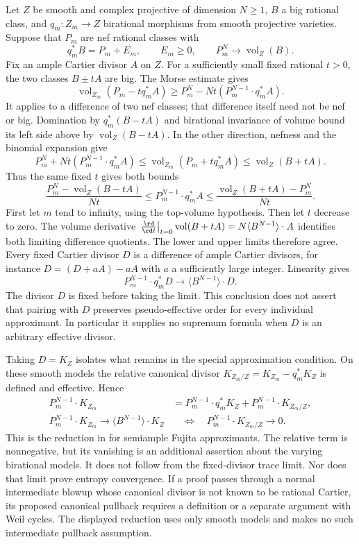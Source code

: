 Let $Z$ be smooth and complex projective of dimension $N\geq1$,
$B$ a big rational class, and $q_m:Z_m\to Z$ birational morphisms
from smooth projective varieties. Suppose that $P_m$ are nef rational
classes with
\[
 q_m^*B=P_m+E_m,\qquad E_m\geq0,
 \qquad P_m^N\longrightarrow\operatorname{vol}_Z(B).
\]
Fix an ample Cartier divisor $A$ on $Z$. For a sufficiently small
fixed rational $t>0$, the two classes $B\pm tA$ are big.
The Morse estimate gives
\[
 \operatorname{vol}_{Z_m}(P_m-tq_m^*A)
       \geq P_m^N-Nt(P_m^{N-1}\cdot q_m^*A).
\]
It applies to a difference of two nef classes; that difference itself
need not be nef or big. Domination by $q_m^*(B-tA)$ and birational
invariance of volume bound its left side above by
$\operatorname{vol}_Z(B-tA)$. In the other direction, nefness and
the binomial expansion give
\[
 P_m^N+Nt(P_m^{N-1}\cdot q_m^*A)
 \leq\operatorname{vol}_{Z_m}(P_m+tq_m^*A)
 \leq\operatorname{vol}_Z(B+tA).
\]
Thus the same fixed $t$ gives both bounds
\[
 \frac{P_m^N-\operatorname{vol}_Z(B-tA)}{Nt}
 \leq P_m^{N-1}\cdot q_m^*A
 \leq\frac{\operatorname{vol}_Z(B+tA)-P_m^N}{Nt}.
\tag{46.10k}\label{eq:ch46-fixed-trace-volume-bounds}
\]
First let $m$ tend to infinity, using the top-volume hypothesis.
Then let $t$ decrease to zero. The volume derivative
$\left.\frac{\rd}{\rd t}\right|_{t=0}\operatorname{vol}(B+tA)
 =N\langle B^{N-1}\rangle\cdot A$
identifies both limiting difference quotients. The lower and upper
limits therefore agree. Every fixed Cartier divisor $D$ is a
difference of ample Cartier divisors, for instance
$D=(D+aA)-aA$ with $a$ a sufficiently large integer. Linearity gives
\[
 P_m^{N-1}\cdot q_m^*D
       \longrightarrow\langle B^{N-1}\rangle\cdot D.
\tag{46.10l}\label{eq:ch46-fixed-divisor-trace-limit}
\]
The divisor $D$ is fixed before taking the limit. This conclusion
does not assert that pairing with $D$ preserves pseudo-effective
order for every individual approximant. In particular it supplies
no supremum formula when $D$ is an arbitrary effective divisor.

Taking $D=K_Z$ isolates what remains in the special approximation
condition. On these smooth models the relative canonical divisor
$K_{Z_m/Z}=K_{Z_m}-q_m^*K_Z$ is defined and effective. Hence
\[
 \begin{aligned}
 P_m^{N-1}\cdot K_{Z_m}
   &=P_m^{N-1}\cdot q_m^*K_Z
                   +P_m^{N-1}\cdot K_{Z_m/Z},\\
 P_m^{N-1}\cdot K_{Z_m}
        \longrightarrow\langle B^{N-1}\rangle\cdot K_Z
   &\quad\Longleftrightarrow\quad
          P_m^{N-1}\cdot K_{Z_m/Z}\longrightarrow0.
 \end{aligned}
\tag{46.10m}\label{eq:ch46-relative-canonical-reduction}
\]
This is the reduction in \cite[Lemma~4.3]{Trusiani26} for semiample
Fujita approximants. The relative term is nonnegative, but its
vanishing is an additional assertion about the varying birational
models. It does not follow from the fixed-divisor trace limit.
Nor does that limit prove entropy convergence. If a proof passes
through a normal intermediate blowup whose canonical divisor is
not known to be rational Cartier, its proposed canonical pullback
requires a definition or a separate argument with Weil cycles.
The displayed reduction uses only smooth models and makes no such
intermediate pullback assumption.

